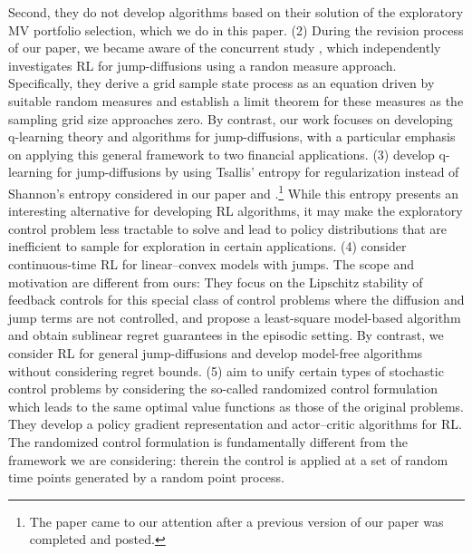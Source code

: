 \documentclass[11pt]{article}
\newcommand{\1}{\mathbbm{1}}
\begin{document}
{Second, they do not develop algorithms based on their solution of the exploratory MV portfolio selection, which we do in this paper.} (2) {During the revision process of our paper, we became aware of the concurrent study \cite{bender2024continuous}, which independently investigates RL for jump-diffusions using a randon measure approach. Specifically, they derive a grid sample state process as an equation driven by suitable random measures and establish a limit theorem for these measures as the sampling grid size approaches zero. By contrast, our work focuses on developing q-learning theory and algorithms for jump-diffusions, with a particular emphasis on applying this general framework to two financial applications.} (3) \cite{bo2024continuous} develop q-learning for jump-diffusions by using Tsallis' entropy for regularization instead of  Shannon's entropy considered in our paper and \cite{jia2022policyb,jia2022q}.\footnote{The paper \cite{bo2024continuous} came to our attention after a previous version of our paper was completed and posted.} While this entropy presents an interesting alternative for developing RL algorithms, it may make the exploratory control problem less tractable to solve and lead to policy distributions that are inefficient to sample for exploration in certain applications. (4) \cite{guo2023reinforcement} consider continuous-time RL for linear--convex models with jumps. The scope and motivation are different from ours: They focus on the  Lipschitz stability of feedback controls for this special class of control problems where the diffusion and jump terms are not controlled, and propose a least-square model-based algorithm and obtain sublinear regret guarantees in the episodic setting. By contrast, we consider RL for general jump-diffusions and develop model-free algorithms without considering regret bounds. (5) \cite{denkert2024control} aim to unify certain types of stochastic control problems by considering the so-called randomized control formulation which leads to the same optimal value functions as those of the original problems. They develop a policy gradient representation and actor--critic algorithms for RL. The randomized control formulation is fundamentally different from the framework we are considering: therein the control is applied at a set of random time points generated by a random point process.%




\end{document}
